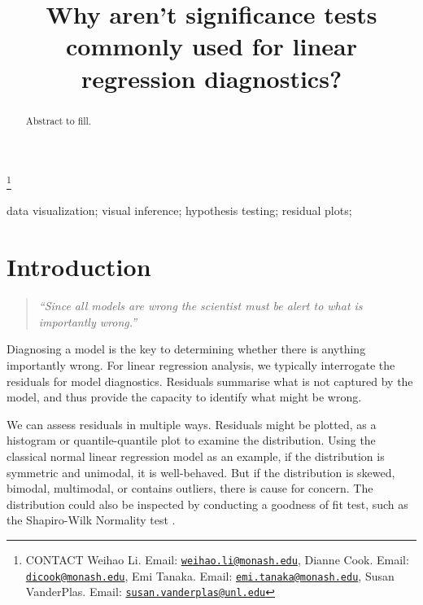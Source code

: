 \documentclass[]{interact}
\theoremstyle{plain}%
\theoremstyle{definition}
\theoremstyle{remark}
\begin{document}

\title{Why aren't significance tests commonly used for linear regression
diagnostics?}


\author{
}

\thanks{CONTACT Weihao
Li. Email: \href{mailto:weihao.li@monash.edu}{\nolinkurl{weihao.li@monash.edu}}, Dianne
Cook. Email: \href{mailto:dicook@monash.edu}{\nolinkurl{dicook@monash.edu}}, Emi
Tanaka. Email: \href{mailto:emi.tanaka@monash.edu}{\nolinkurl{emi.tanaka@monash.edu}}, Susan
VanderPlas. Email: \href{mailto:susan.vanderplas@unl.edu}{\nolinkurl{susan.vanderplas@unl.edu}}}

\maketitle

\begin{abstract}
Abstract to fill.
\end{abstract}

\begin{keywords}
data visualization; visual inference; hypothesis testing; residual
plots;
\end{keywords}

\hypertarget{introduction}{%
\section{Introduction}\label{introduction}}

\begin{quote}
\emph{``Since all models are wrong the scientist must be alert to what
is importantly wrong.''} \citep{box1976science}
\end{quote}

Diagnosing a model is the key to determining whether there is anything
importantly wrong. For linear regression analysis, we typically
interrogate the residuals for model diagnostics. Residuals summarise
what is not captured by the model, and thus provide the capacity to
identify what might be wrong.

We can assess residuals in multiple ways. Residuals might be plotted, as
a histogram or quantile-quantile plot to examine the distribution. Using
the classical normal linear regression model as an example, if the
distribution is symmetric and unimodal, it is well-behaved. But if the
distribution is skewed, bimodal, multimodal, or contains outliers, there
is cause for concern. The distribution could also be inspected by
conducting a goodness of fit test, such as the Shapiro-Wilk Normality
test \citep{shapiro1965analysis}.
\end{document}
